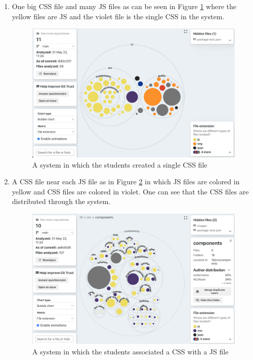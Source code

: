 \documentclass[conference]{IEEEtran}
\begin{document}
\begin{enumerate}
    \item One big CSS file and many JS files as can be seen in Figure \ref{fig:tid_11} where the yellow files are JS and the violet file is the single CSS in the system.

    \begin{figure}[h!]
    \centering
    \includegraphics[width=0.8\linewidth]{img/tid_11_wide.png}
    \caption{A system in which the students created a single CSS file}
    \label{fig:tid_11}
    \end{figure}


    \item A CSS file near each JS file as in Figure \ref{fig:tid_10} in which JS files are colored in yellow and CSS files are colored in violet. One can see that the CSS files are distributed through the system.

    \begin{figure}[h]
    \centering
    \includegraphics[width=0.8\linewidth]{img/tid_10_wide.png}
    \caption{A system in which the students associated a CSS with a JS file}
    \label{fig:tid_10}
    \end{figure}


\end{enumerate}
\end{document}
